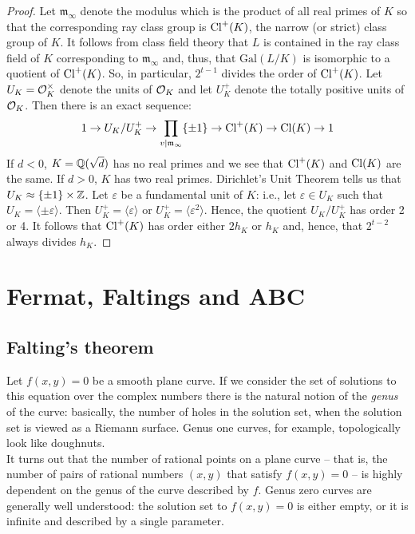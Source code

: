 \documentclass{book}
\begin{document}
\begin{proof}
Let $\mathfrak{m}_{\infty}$  denote the modulus which is the product of all
real primes of $K$ so that the corresponding ray class group is $\operatorname{Cl}^+(K)$,
the narrow (or strict) class group of $K$.  It follows from class field
theory that $L$ is contained in the ray class field of $K$ corresponding to
$\mathfrak{m}_\infty$ and, thus, that $\mathrm{Gal}(L/K)$ is isomorphic to a
quotient of $\operatorname{Cl}^+(K)$.  So, in particular, $2^{t-1}$ divides the order of
$\operatorname{Cl}^+(K)$.  Let $U_K = \mathcal{O}_K^\times$ denote the units of $\mathcal{O}_K$ and let
$U_K^+$ denote the totally positive units of $\mathcal{O}_K$.  Then there is an exact
sequence:
$$
1 \rightarrow U_K/U_K^+ \rightarrow \prod_{v|\mathfrak{m}_\infty} \{\pm 1\}
\rightarrow \operatorname{Cl}^+(K) \rightarrow \operatorname{Cl}(K) \rightarrow 1
$$
If $d < 0$, $K = \mathbb{Q}(\sqrt{d})$ has no real primes and we see that $\operatorname{Cl}^+(K)$
and $\operatorname{Cl}(K)$ are the same.  If $d > 0$, $K$ has two real primes.
Dirichlet's Unit Theorem tells us that $U_K \approx \{\pm 1\} \times \mathbb{Z}$.
Let $\varepsilon$ be a fundamental unit of $K$: i.e., let $\varepsilon \in
U_K$ such that $U_K = \langle\pm \varepsilon\rangle$.  Then $U_K^+ = \langle
\varepsilon\rangle$ or $U_K^+ = \langle\varepsilon^2\rangle$.  Hence, the
quotient $U_K/U_K^+$ has order 2 or 4.  It follows that $\operatorname{Cl}^+(K)$ has order
either $2h_K$ or $h_K$ and, hence, that $2^{t-2}$ always divides $h_K$.
\end{proof}

\chapter{Fermat, Faltings and ABC}
\section{Falting's theorem}\label{sec:faltings}
Let $f(x,y)=0$ be a smooth plane curve. If we
consider the set of solutions to this equation over
the complex numbers there is the natural notion of
the {\it genus} of the curve: basically, the number
of holes in the solution set, when the solution set
is viewed as a Riemann surface. Genus one curves, for
example, topologically look like doughnuts. \\

It turns out that the number of rational points on a
plane curve -- that is, the number of pairs of
rational numbers $(x,y)$ that satisfy $f(x,y)=0$ --
is highly dependent on the genus of the curve
described by $f$. Genus zero curves are generally
well understood: the solution set to $f(x,y)=0$ is
either empty, or it is infinite and described by a
single parameter. \\
\end{document}
